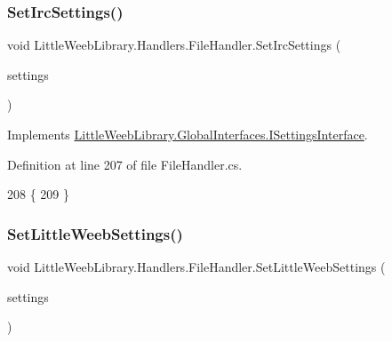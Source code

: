 \mbox{\label{class_little_weeb_library_1_1_handlers_1_1_file_handler_a4ccfd9a9698ca0dc9e228aabe27ac756}} 
\subsubsection{\texorpdfstring{Set\+Irc\+Settings()}{SetIrcSettings()}}
{\footnotesize\ttfamily void Little\+Weeb\+Library.\+Handlers.\+File\+Handler.\+Set\+Irc\+Settings (\begin{DoxyParamCaption}\item[{\mbox{\hyperlink{class_little_weeb_library_1_1_settings_1_1_irc_settings}{Irc\+Settings}}}]{settings }\end{DoxyParamCaption})}



Implements \mbox{\hyperlink{interface_little_weeb_library_1_1_global_interfaces_1_1_i_settings_interface_a9ddf06e247a96d757482b37ddb070e3d}{Little\+Weeb\+Library.\+Global\+Interfaces.\+I\+Settings\+Interface}}.



Definition at line 207 of file File\+Handler.\+cs.


\begin{DoxyCode}
208         \{
209         \}
\end{DoxyCode}
\mbox{\label{class_little_weeb_library_1_1_handlers_1_1_file_handler_a81ebb3e28e77c5fc30acaf7d769ba8df}} 
\subsubsection{\texorpdfstring{Set\+Little\+Weeb\+Settings()}{SetLittleWeebSettings()}}
{\footnotesize\ttfamily void Little\+Weeb\+Library.\+Handlers.\+File\+Handler.\+Set\+Little\+Weeb\+Settings (\begin{DoxyParamCaption}\item[{\mbox{\hyperlink{class_little_weeb_library_1_1_settings_1_1_little_weeb_settings}{Little\+Weeb\+Settings}}}]{settings }\end{DoxyParamCaption})}



